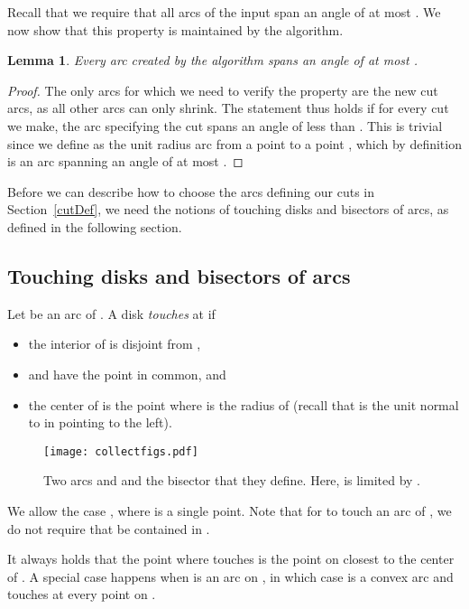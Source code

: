 \documentclass{article}
\newtheorem{lemma}[theorem]{Lemma}
\begin{document}
Recall that we require that all arcs of the input  span an angle of at most .
We now show that this property is maintained by the algorithm.

\begin{lemma}\label{lem:leqpi}
Every arc created by the algorithm spans an angle of at most .
\end{lemma}

\begin{proof}
The only arcs for which we need to verify the property are the new cut arcs, as all other arcs can only shrink.
The statement thus holds if for every cut we make, the arc  specifying the cut spans an angle of less than .
This is trivial since we define  as the unit radius arc from a point  to a point , which by definition is an arc spanning an angle of at most .
\end{proof}

Before we can describe how to choose the arcs defining our cuts in Section~\ref{cutDef}, we need the notions of touching disks and bisectors of arcs, as defined in the following section.

\subsection{Touching disks and bisectors of arcs}

Let  be an arc of .
A disk  \emph{touches}  at  if
\begin{itemize}
\item
the interior of  is disjoint from ,

\item
 and  have the
point  in common, and

\item
the center  of  is the point  where  is the radius of  (recall that  is the unit normal to  in  pointing to the left).
\end{itemize}

\begin{figure}
\centering
\texttt{[image: collectfigs.pdf]}
\caption{
Two arcs  and  and the bisector  that they define.
Here,  is limited by .
}
\label{fig:bisector}
\end{figure}

We allow the case , where  is a single point.
Note that for  to touch an arc  of , we do not require that  be contained in .

It always holds that the point  where  touches  is the point on  closest to the center  of .
A special case happens when  is an arc on , in which case  is a convex arc and  touches  at every point on .
\end{document}
